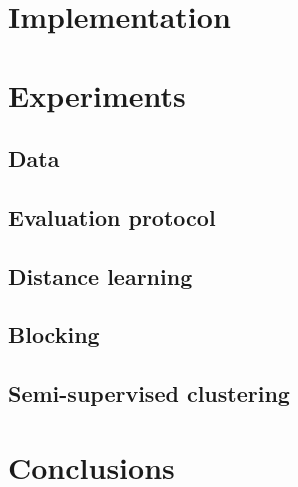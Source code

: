\documentclass{article}
\begin{document}
\section{Implementation}
\label{implementation}



\section{Experiments}
\label{experiments}

\subsection{Data}

\subsection{Evaluation protocol}

\subsection{Distance learning}

\subsection{Blocking}

\subsection{Semi-supervised clustering}



\section{Conclusions}
\label{conclusions}






\end{document}
